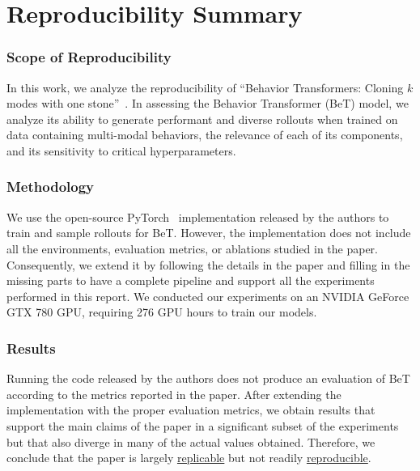 \section*{\centering Reproducibility Summary}

\subsubsection*{Scope of Reproducibility}

In this work, we analyze the reproducibility of
``Behavior Transformers: Cloning $k$ modes with one stone''~\cite{shafiullah2022behavior}.
In assessing the Behavior Transformer (BeT) model, we analyze its ability to generate performant and diverse rollouts when trained on data containing multi-modal behaviors,
the relevance of each of its components,
and its sensitivity to critical hyperparameters.

\subsubsection*{Methodology}

We use the open-source PyTorch~\cite{NEURIPS2019_pytorch} implementation released by the authors to train and sample rollouts for BeT.
However, the implementation does not include all the environments, evaluation metrics, or ablations studied in the paper.
Consequently, we extend it by following the details in the paper and filling in the missing parts to have a complete pipeline and support all the experiments performed in this report.
We conducted our experiments on an NVIDIA GeForce GTX 780 GPU, requiring 276 GPU hours to train our models.

\subsubsection*{Results}

Running the code released by the authors does not produce an evaluation of BeT according to the metrics reported in the paper.
After extending the implementation with the proper evaluation metrics, we obtain results that support the main claims of the paper in a significant subset of the experiments but that also diverge in many of the actual values obtained.
Therefore, we conclude that the paper is largely \href{http://rescience.github.io/faq/#whats-the-difference-between-replication-and-reproduction}{replicable} but not readily \href{http://rescience.github.io/faq/#whats-the-difference-between-replication-and-reproduction}{reproducible}.

